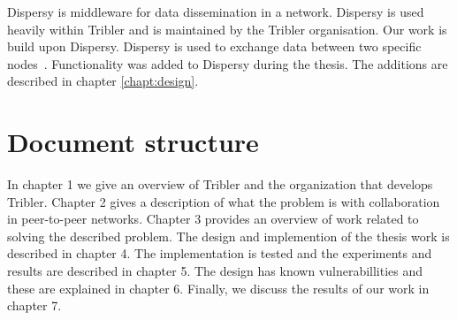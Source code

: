 Dispersy is middleware for data dissemination in a network.
Dispersy is used heavily within Tribler and is maintained by the Tribler organisation.
Our work is build upon Dispersy.
Dispersy is used to exchange data between two specific nodes~\cite{zeilemaker-dispersy}.
Functionality was added to Dispersy during the thesis.
The additions are described in chapter \ref{chapt:design}.

\section{Document structure}
In chapter 1 we give an overview of Tribler and the organization that develops Tribler.
Chapter 2 gives a description of what the problem is with collaboration in peer-to-peer networks.
Chapter 3 provides an overview of work related to solving the described problem.
The design and implemention of the thesis work is described in chapter 4.
The implementation is tested and the experiments and results are described in chapter 5.
The design has known vulnerabillities and these are explained in chapter 6.
Finally, we discuss the results of our work in chapter 7.
